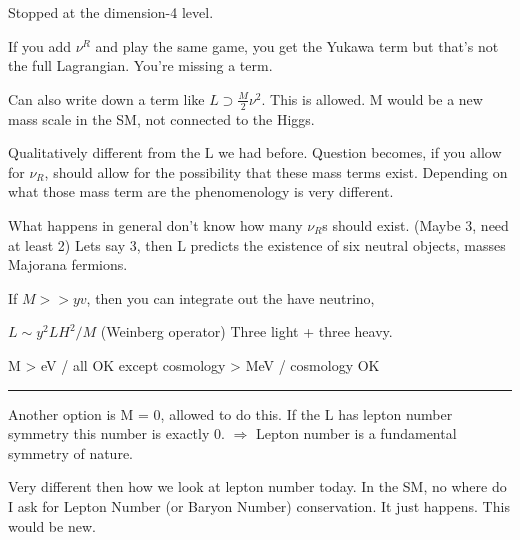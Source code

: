 {Stopped at the dimension-4 level. 

If you add $\nu^R$ and play the same game, you get the Yukawa term but that's not the full Lagrangian.
You're missing a term. 

Can also write down a term like $L \supset \frac{M}{2} \nu^2$. 
This is allowed.
M would be a new mass scale in the SM, not connected to the Higgs. 

Qualitatively different from the L we had before. 
Question becomes, if you allow for $\nu_R$, should allow for the possibility that these mass terms exist. 
Depending on what those mass term are the phenomenology is very different. 

What happens in general don't know how many $\nu_R$s should exist. (Maybe 3, need at least 2) 
Lets say 3, then L predicts the existence of six neutral objects, masses Majorana fermions.

If $M >> yv$, then you can integrate out the have neutrino,

$L \sim y^2 LH^2 / M$  (Weinberg operator) 
Three light + three heavy. 

M > eV / all OK except cosmology 
  > MeV / cosmology OK

\noindent\rule{\textwidth}{1pt}

Another option is M = 0, allowed to do this. 
If the L has lepton number symmetry this number is exactly 0. 
 $\Rightarrow$ Lepton number is a fundamental symmetry of nature. 

Very different then how we look at lepton number today. 
In the SM, no where do I ask for Lepton Number (or Baryon Number) conservation. 
It just happens. 
This would be new. 


  

}




